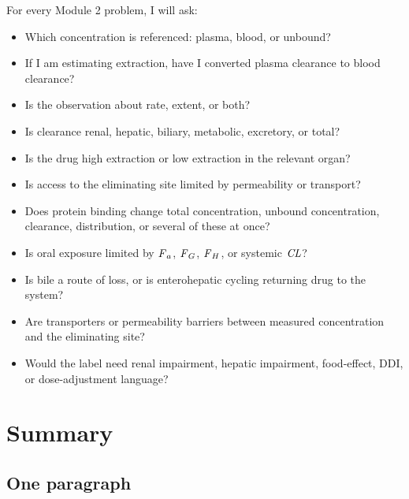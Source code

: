 \documentclass[a4paper]{article}
\newcommand{\CL}{\ensuremath{\pksym{CL}}}
\newcommand{\Fa}{\ensuremath{\pksym{F}_a}}
\newcommand{\Fg}{\ensuremath{\pksym{F}_G}}
\newcommand{\Fh}{\ensuremath{\pksym{F}_H}}
\begin{document}
For every Module 2 problem, I will ask:
\begin{itemize}[leftmargin=2em]
  \item Which concentration is referenced: plasma, blood, or unbound?
  \item If I am estimating extraction, have I converted plasma clearance to blood clearance?
  \item Is the observation about rate, extent, or both?
  \item Is clearance renal, hepatic, biliary, metabolic, excretory, or total?
  \item Is the drug high extraction or low extraction in the relevant organ?
  \item Is access to the eliminating site limited by permeability or transport?
  \item Does protein binding change total concentration, unbound concentration, clearance, distribution, or several of these at once?
  \item Is oral exposure limited by \(\Fa\), \(\Fg\), \(\Fh\), or systemic \(\CL\)?
  \item Is bile a route of loss, or is enterohepatic cycling returning drug to the system?
  \item Are transporters or permeability barriers between measured concentration and the eliminating site?
  \item Would the label need renal impairment, hepatic impairment, food-effect, DDI, or dose-adjustment language?
\end{itemize}

\section{Summary}

\subsection{One paragraph}
\end{document}
